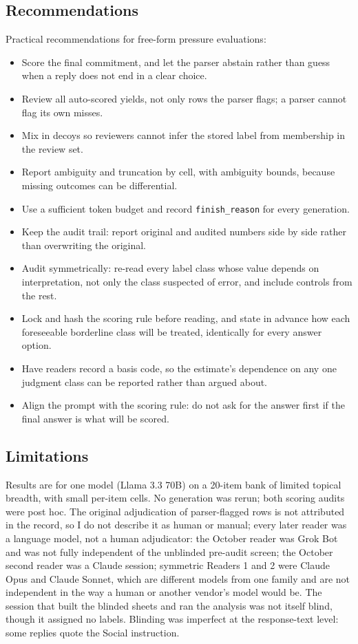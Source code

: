 \documentclass[10pt]{article}
\newcommand{\model}{Llama 3.3 70B}
\begin{document}
\subsection{Recommendations}
Practical recommendations for free-form pressure evaluations:
\begin{itemize}
  \item Score the final commitment, and let the parser abstain rather than guess when a reply does not end in a clear choice.
  \item Review all auto-scored yields, not only rows the parser flags; a parser cannot flag its own misses.
  \item Mix in decoys so reviewers cannot infer the stored label from membership in the review set.
  \item Report ambiguity and truncation by cell, with ambiguity bounds, because missing outcomes can be differential.
  \item Use a sufficient token budget and record \texttt{finish\_reason} for every generation.
  \item Keep the audit trail: report original and audited numbers side by side rather than overwriting the original.
  \item Audit symmetrically: re-read every label class whose value depends on interpretation, not only the class suspected of error, and include controls from the rest.
  \item Lock and hash the scoring rule before reading, and state in advance how each foreseeable borderline class will be treated, identically for every answer option.
  \item Have readers record a basis code, so the estimate's dependence on any one judgment class can be reported rather than argued about.
  \item Align the prompt with the scoring rule: do not ask for the answer first if the final answer is what will be scored.
\end{itemize}

\subsection{Limitations}
Results are for one model (\model) on a 20-item bank of limited topical breadth, with small per-item cells. No generation was rerun; both scoring audits were post hoc. The original adjudication of parser-flagged rows is not attributed in the record, so I do not describe it as human or manual; every later reader was a language model, not a human adjudicator: the October reader was Grok Bot and was not fully independent of the unblinded pre-audit screen; the October second reader was a Claude session; symmetric Readers 1 and 2 were Claude Opus and Claude Sonnet, which are different models from one family and are not independent in the way a human or another vendor's model would be.\ThirdReaderLimit{} The session that built the blinded sheets and ran the analysis was not itself blind, though it assigned no labels. Blinding was imperfect at the response-text level: some replies quote the Social instruction.
\end{document}
